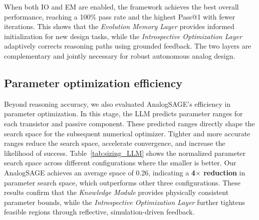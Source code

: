 \documentclass[sigconf,nonacm]{acmart}
\begin{document}
When both IO and EM are enabled, the framework achieves the best overall performance, reaching a 100\% pass rate and the highest Pass@1 with fewer iterations. This shows that the \emph{Evolution Memory Layer} provides informed initialization for new design tasks, while the \emph{Introspective Optimization Layer} adaptively corrects reasoning paths using grounded feedback. The two layers are complementary and jointly necessary for robust autonomous analog design.


\subsection{Parameter optimization efficiency}



Beyond reasoning accuracy, we also evaluated AnalogSAGE’s efficiency in parameter optimization. In this stage, the LLM predicts parameter ranges for each transistor and passive component. These predicted ranges directly shape the search space for the subsequent numerical optimizer. Tighter and more accurate ranges reduce the search space, accelerate convergence, and increase the likelihood of success.
Table~\ref{tab:sizing_LLM} shows the normalized parameter search space across different configurations where the smaller is better.  
Our AnalogSAGE achieves an average space of 0.26, indicating a \textbf{4$\times$ reduction} in parameter search space, which outperforms other three configurations.  
These results confirm that the \emph{Knowledge Module} provides physically consistent parameter bounds, while the \emph{Introspective Optimization Layer} further tightens feasible regions through reflective, simulation-driven feedback.
\end{document}

